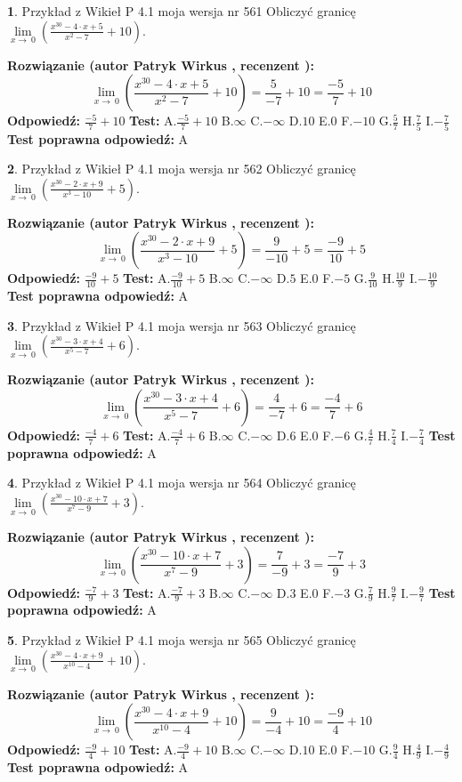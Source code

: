 \documentclass[12pt, a4paper]{article}
\theoremstyle{definition} %
\newtheorem{zad}{}
\newcommand{\zadStart}[1]{\begin{zad}#1\newline}
\newcommand{\zadStop}{\end{zad}}
\newcommand{\rozwStart}[2]{\noindent \textbf{Rozwiązanie (autor #1 , recenzent #2): }\newline}
\newcommand{\rozwStop}{\newline}
\newcommand{\odpStart}{\noindent \textbf{Odpowiedź:}\newline}
\newcommand{\odpStop}{\newline}
\newcommand{\testStart}{\noindent \textbf{Test:}\newline}
\newcommand{\testStop}{\newline}
\newcommand{\kluczStart}{\noindent \textbf{Test poprawna odpowiedź:}\newline}
\newcommand{\kluczStop}{\newline}
\begin{document}
\zadStart{Przykład z Wikieł P 4.1 moja wersja nr 561}
Obliczyć granicę $\lim\limits_{x\to\ 0}(\frac{x^{30}-4 \cdot x +5}{x^{2}-7}+10)$.
\zadStop
\rozwStart{Patryk Wirkus}{}
$$\lim\limits_{x\to\ 0}(\frac{x^{30}-4 \cdot x +5}{x^{2}-7}+10)=\frac{5}{-7}+10=\frac{-5}{7}+10$$
\rozwStop
\odpStart
$\frac{-5}{7}+10$
\odpStop
\testStart
A.$\frac{-5}{7}+10$
B.$\infty$
C.$-\infty$
D.$10$
E.$0$
F.$-10$
G.$\frac{5}{7}$
H.$\frac{7}{5}$
I.$-\frac{7}{5}$
\testStop
\kluczStart
A
\kluczStop



\zadStart{Przykład z Wikieł P 4.1 moja wersja nr 562}
Obliczyć granicę $\lim\limits_{x\to\ 0}(\frac{x^{30}-2 \cdot x +9}{x^{3}-10}+5)$.
\zadStop
\rozwStart{Patryk Wirkus}{}
$$\lim\limits_{x\to\ 0}(\frac{x^{30}-2 \cdot x +9}{x^{3}-10}+5)=\frac{9}{-10}+5=\frac{-9}{10}+5$$
\rozwStop
\odpStart
$\frac{-9}{10}+5$
\odpStop
\testStart
A.$\frac{-9}{10}+5$
B.$\infty$
C.$-\infty$
D.$5$
E.$0$
F.$-5$
G.$\frac{9}{10}$
H.$\frac{10}{9}$
I.$-\frac{10}{9}$
\testStop
\kluczStart
A
\kluczStop



\zadStart{Przykład z Wikieł P 4.1 moja wersja nr 563}
Obliczyć granicę $\lim\limits_{x\to\ 0}(\frac{x^{30}-3 \cdot x +4}{x^{5}-7}+6)$.
\zadStop
\rozwStart{Patryk Wirkus}{}
$$\lim\limits_{x\to\ 0}(\frac{x^{30}-3 \cdot x +4}{x^{5}-7}+6)=\frac{4}{-7}+6=\frac{-4}{7}+6$$
\rozwStop
\odpStart
$\frac{-4}{7}+6$
\odpStop
\testStart
A.$\frac{-4}{7}+6$
B.$\infty$
C.$-\infty$
D.$6$
E.$0$
F.$-6$
G.$\frac{4}{7}$
H.$\frac{7}{4}$
I.$-\frac{7}{4}$
\testStop
\kluczStart
A
\kluczStop



\zadStart{Przykład z Wikieł P 4.1 moja wersja nr 564}
Obliczyć granicę $\lim\limits_{x\to\ 0}(\frac{x^{30}-10 \cdot x +7}{x^{7}-9}+3)$.
\zadStop
\rozwStart{Patryk Wirkus}{}
$$\lim\limits_{x\to\ 0}(\frac{x^{30}-10 \cdot x +7}{x^{7}-9}+3)=\frac{7}{-9}+3=\frac{-7}{9}+3$$
\rozwStop
\odpStart
$\frac{-7}{9}+3$
\odpStop
\testStart
A.$\frac{-7}{9}+3$
B.$\infty$
C.$-\infty$
D.$3$
E.$0$
F.$-3$
G.$\frac{7}{9}$
H.$\frac{9}{7}$
I.$-\frac{9}{7}$
\testStop
\kluczStart
A
\kluczStop



\zadStart{Przykład z Wikieł P 4.1 moja wersja nr 565}
Obliczyć granicę $\lim\limits_{x\to\ 0}(\frac{x^{30}-4 \cdot x +9}{x^{10}-4}+10)$.
\zadStop
\rozwStart{Patryk Wirkus}{}
$$\lim\limits_{x\to\ 0}(\frac{x^{30}-4 \cdot x +9}{x^{10}-4}+10)=\frac{9}{-4}+10=\frac{-9}{4}+10$$
\rozwStop
\odpStart
$\frac{-9}{4}+10$
\odpStop
\testStart
A.$\frac{-9}{4}+10$
B.$\infty$
C.$-\infty$
D.$10$
E.$0$
F.$-10$
G.$\frac{9}{4}$
H.$\frac{4}{9}$
I.$-\frac{4}{9}$
\testStop
\kluczStart
A
\kluczStop
\end{document}
